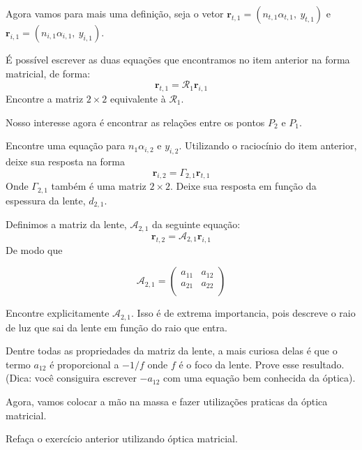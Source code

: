 \documentclass[11pt]{article}
\begin{document}
\begin{pproblem}
\begin{alternativas}
        Agora vamos para mais uma definição, seja o vetor \(\mathbf{r}_{t,1}= (n_{t,1}\alpha_{t,1}, \ y_{t,1})\) e \(\mathbf{r}_{i,1}= (n_{i,1}\alpha_{i,1}, \ y_{i,1})\).
        
            \item É possível escrever as duas equações que encontramos no item anterior na forma matricial, de forma:
            \[\mathbf{r}_{t,1}=\mathcal{R}_1\mathbf{r}_{i,1}\]
            Encontre a matriz \(2\times 2\) equivalente à \(\mathcal{R}_1\).

        Nosso interesse agora é encontrar as relações entre os pontos \(P_2\) e \(P_1\).

            \item Encontre uma equação para \(n_1\alpha_{i,2}\) e \(y_{i,2}\). Utilizando o raciocínio do item anterior, deixe sua resposta na forma
            \[\mathbf{r}_{i,2}=\Gamma_{2,1}\mathbf{r}_{t,1}\]
            Onde \(\Gamma_{2,1}\) também é uma matriz \(2\times 2\). Deixe sua resposta em função da espessura da lente, \(d_{2,1}\).

            \item Definimos a matriz da lente, \(\mathcal{A}_{2,1}\) da seguinte equação:
            \[\mathbf{r}_{t,2} = \mathcal{A}_{2,1}\mathbf{r}_{i,1}\]
            De modo que

            \[\mathcal{A}_{2,1} = \begin{pmatrix}
                a_{11} & a_{12} \\
                a_{21} & a_{22} \\
            \end{pmatrix}\]

            Encontre explicitamente \(\mathcal{A}_{2,1}\). Isso é de extrema importancia, pois descreve o raio de luz que sai da lente em função do raio que entra.

            \item Dentre todas as propriedades da matriz da lente, a mais curiosa delas é que o termo \(a_{12}\) é proporcional a \(-1/f\) onde \(f\) é o foco da lente. Prove esse resultado. (Dica: você consiguira escrever \(-a_{12}\) com uma equação bem conhecida da óptica).
        
        Agora, vamos colocar a mão na massa e fazer utilizações praticas da óptica matricial.

            \item Refaça o exercício anterior utilizando óptica matricial.
        

\end{alternativas}
\end{pproblem}
\end{document}
